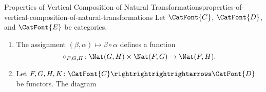 \begin{proposition}{Properties of Vertical Composition of Natural Transformations}{properties-of-vertical-composition-of-natural-transformations}%
    Let $\CatFont{C}$, $\CatFont{D}$, and $\CatFont{E}$ be categories.
    \begin{enumerate}
        \item\label{properties-of-vertical-composition-of-natural-transformations-functionality}The assignment $(\beta,\alpha)\mapsto\beta\circ\alpha$ defines a function
            \[
                \circ_{F,G,H}%
                \colon%
                \Nat(G,H)%
                \times
                \Nat(F,G)%
                \to%
                \Nat(F,H).%
            \]%
        \item\label{properties-of-vertical-composition-of-natural-transformations-associativity}Let $F,G,H,K\colon\CatFont{C}\rightrightrightrightarrows\CatFont{D}$ be functors. The diagram
            \begin{scalemath}
\end{scalemath}
\end{enumerate}
\end{proposition}
